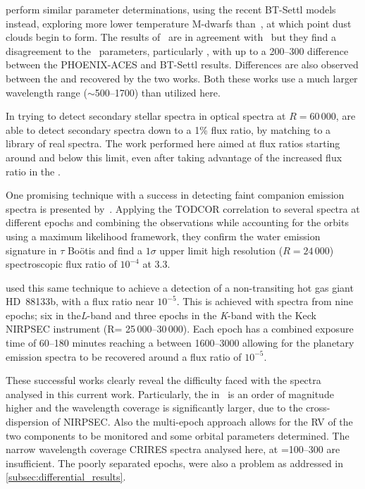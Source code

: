 \citet{rajpurohit_exploring_2018} perform similar parameter determinations, using the recent {BT-Settl} models instead, exploring more lower temperature {M-dwarfs} than~\citet{passegger_carmenes_2018}, at which point dust clouds begin to form.
The results of~\citet{rajpurohit_exploring_2018} are in agreement with~\citep{gaidos_dwarf_2014} but they find a disagreement to the~\citet{passegger_carmenes_2018} parameters, particularly \Teff{}, with up to a 200--300\K{} difference between the {PHOENIX-ACES} and {BT-Settl} results.
Differences are also observed between the \Logg{} and \feh{} recovered by the two works.
Both these works use a much larger wavelength range (\(\sim\)500--1700\nm{}) than utilized here.

In trying to detect secondary stellar spectra in optical spectra at \(R=60\,000\), \citep{kolbl_detection_2015} are able to detect secondary spectra down to a 1\% flux ratio, by matching to a library of real spectra.
The work performed here aimed at flux ratios starting around and below this limit, even after taking advantage of the increased flux ratio in the \nir{}.
    
One promising technique with a success in detecting faint companion emission spectra is presented by~\citet{lockwood_nearir_2014}.
Applying the {TODCOR} correlation to several spectra at different epochs and combining the observations while accounting for the orbits using a maximum likelihood framework, they confirm the water emission signature in {\(\tau\) Bo\"{o}tis} and find a \(1\sigma\) upper limit high resolution (\(R=24\,000\)) spectroscopic flux ratio of \(10^{-4}\) at 3.3\um{}.

\citet{piskorz_evidence_2016} used this same technique to achieve a detection of a non-transiting hot gas giant {HD~88133}b, with a flux ratio near \(10^{-5}\).
This is achieved with spectra from nine epochs; six in the\emph{L}-band and three epochs in the \emph{K}-band with the Keck {NIRPSEC} instrument (R= 25\,000--30\,000).
Each epoch has a combined exposure time of 60--180 minutes reaching a \snr{} between 1600--3000 allowing for the planetary emission spectra to be recovered around a flux ratio of \(10^{-5}\).

These successful works clearly reveal the difficulty faced with the spectra analysed in this current work.
Particularly, the \snr{} in~\citet{piskorz_evidence_2016} is an order of magnitude higher and the wavelength coverage is significantly larger, due to the cross-dispersion of {NIRPSEC}.
Also the multi-epoch approach allows for the {RV} of the two components to be monitored and some orbital parameters determined.
The narrow wavelength coverage CRIRES spectra analysed here, at \snr{}=100--300 are insufficient.
The poorly separated epochs, were also a problem as addressed in \cref{subsec:differential_results}.

